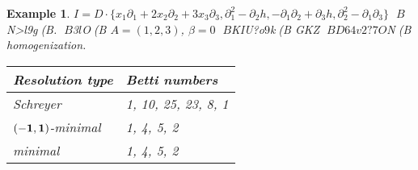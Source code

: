 \documentclass[12pt]{jarticle}
\newtheorem{example}{Example}
\def\pd#1{ \partial_{#1} }
\begin{document}
\begin{example} \rm
$I = D\cdot\{  x_1\pd{1}+2x_2\pd{2}+3x_3\pd{3} ,
    \pd{1}^2-\pd{2}h,
    -\pd{1}\pd{2}+\pd{3}h,
    \pd{2}^2-\pd{1}\pd{3} \}
$ $B$N>l9g(B.
$B$3$l$O(B $A=(1,2,3)$, $\beta=0$ $B$KIU?o$9$k(B GKZ $BD64v2?7O$N(B
homogenization.

\begin{tabular}{|l|l|}
\hline
Resolution type &  Betti numbers          \\ \hline
Schreyer &                  1, 10, 25, 23, 8, 1    \\ \hline
$(-{\bf 1},{\bf 1})$-minimal &    1, 4, 5, 2  \\ \hline
minimal &                         1, 4, 5,  2    \\
\hline
\end{tabular}


\end{example}
\end{document}
